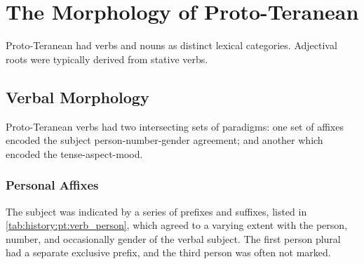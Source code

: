\documentclass[grammar]{subfiles}
\begin{document}

\section{The Morphology of Proto-Teranean}
\label{sec:history:proto_teranean:morphology}

Proto-Teranean had verbs and nouns as distinct lexical categories.  Adjectival
roots were typically derived from stative verbs.

\subsection{Verbal Morphology}
\label{ssec:history:pt:verbal_morphology}

Proto-Teranean verbs had two intersecting sets of paradigms: one set of affixes
encoded the subject person-number-gender agreement; and another which encoded
the tense-aspect-mood.  

\subsubsection{Personal Affixes}
\label{sssec:history:pt:vm:subject_agreement}

The subject was indicated by a series of prefixes and suffixes, listed in
\cref{tab:history:pt:verb_person}, which agreed to a varying extent with the
person, number, and occasionally gender of the verbal subject.  The first
person plural had a separate exclusive prefix, and the third person was often
not marked.
\end{document}
